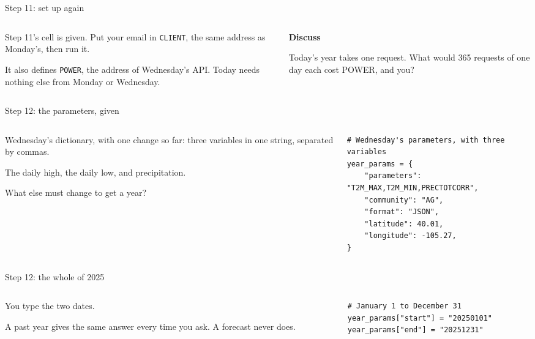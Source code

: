 \documentclass[9pt,aspectratio=169]{beamer}
\begin{document}
\begin{frame}{Step 11: set up again}
    \begin{columns}[T]
        \begin{column}{0.6\textwidth}
            Step 11's cell is given. Put your email in \texttt{CLIENT}, the same address as Monday's, then run it.

            \medskip
            It also defines \texttt{POWER}, the address of Wednesday's API. Today needs nothing else from Monday or Wednesday.
        \end{column}
        \begin{column}{0.35\textwidth}
            \textbf{Discuss}\\[2pt]
            {\footnotesize Today's year takes one request. What would 365 requests of one day each cost POWER, and you?\par}
        \end{column}
    \end{columns}
\end{frame}

\begin{frame}[fragile]{Step 12: the parameters, given}
    \begin{columns}[T]
        \begin{column}{0.37\textwidth}
            Wednesday's dictionary, with one change so far: three variables in one string, separated by commas.

            \medskip
            The daily high, the daily low, and precipitation.

            \medskip
            What else must change to get a year?
        \end{column}
        \begin{column}{0.6\textwidth}
\begin{lstlisting}
# Wednesday's parameters, with three variables
year_params = {
    "parameters": "T2M_MAX,T2M_MIN,PRECTOTCORR",
    "community": "AG",
    "format": "JSON",
    "latitude": 40.01,
    "longitude": -105.27,
}
\end{lstlisting}
        \end{column}
    \end{columns}
\end{frame}

\begin{frame}[fragile]{Step 12: the whole of 2025}
    \begin{columns}[T]
        \begin{column}{0.37\textwidth}
            You type the two dates.

            \medskip
            A past year gives the same answer every time you ask. A forecast never does.
        \end{column}
        \begin{column}{0.6\textwidth}
\begin{lstlisting}
# January 1 to December 31
year_params["start"] = "20250101"
year_params["end"] = "20251231"
\end{lstlisting}
        \end{column}
    \end{columns}
\end{frame}
\end{document}
